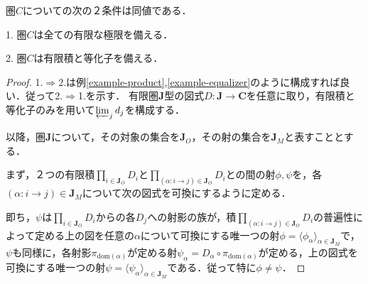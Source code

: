 \documentclass[uplatex, 12pt, dvipdfmx]{jsarticle}
\begin{document}
\vspace{3cm}

\begin{proposition}\label{prop-necessaries-for-limits}
    圏$C$についての次の２条件は同値である．

    1. 圏$C$は全ての有限な極限を備える．

    2. 圏$C$は有限積と等化子を備える．
\end{proposition}
\begin{proof}
    1.$\Rightarrow$2.は例\ref{example-product},\ref{example-equalizer}のように構成すれば良い．従って2.$\Rightarrow$1.を示す．
    有限圏$\mathbf{J}$型の図式$D:\mathbf{J}\to\mathbf{C}$を任意に取り，有限積と等化子のみを用いて$\varprojlim_{j}d_j$を構成する．

    以降，圏$\mathbf{J}$について，その対象の集合を$\mathbf{J}_O$，その射の集合を$\mathbf{J}_M$と表すこととする．
    
    まず，２つの有限積$\prod_{i\in\mathbf{J}_O}D_i$と$\prod_{(\alpha:i\to j)\in\mathbf{J}_O}D_i$との間の射$\phi,\psi$を，各$(\alpha:i\to j)\in\mathbf{J}_M$について次の図式を可換にするように定める．
    \begin{center}
    \end{center}
    即ち，$\psi$は$\prod_{i\in\mathbf{J}_O}D_i$からの各$D_j$への射影の族が，積$\prod_{(\alpha:i\to j)\in\mathbf{J}_O}D_i$の普遍性によって定める上の図を任意の$\alpha$について可換にする唯一つの射$\phi=\langle\phi_\alpha\rangle_{\alpha\in\mathbf{J}_M}$で，$\psi$も同様に，各射影$\pi_{\mathrm{dom}(\alpha)}$が定める射$\psi_\alpha=D_\alpha\circ\pi_{\mathrm{dom}(\alpha)}$が定める，上の図式を可換にする唯一つの射$\psi=\langle\psi_\alpha\rangle_{\alpha\in\mathbf{J}_M}$である．従って特に$\phi\ne\psi$．


\end{proof}
\end{document}
